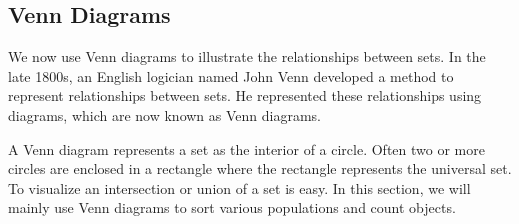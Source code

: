 \subsection{Venn Diagrams}

We now use Venn diagrams to illustrate the relationships between sets. In the late 1800s, an English logician named John Venn developed a method to represent relationships between sets. He represented these relationships using diagrams, which are now known as Venn diagrams.

A Venn diagram represents a set as the interior of a circle. Often two or more circles are enclosed in a rectangle where the rectangle represents the universal set. To visualize an intersection or union of a set is easy. In this section, we will mainly use Venn diagrams to sort various populations and count objects.

